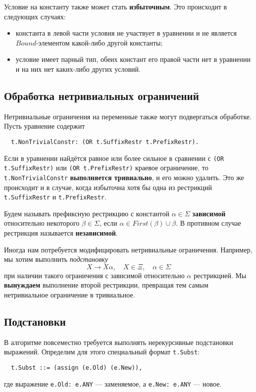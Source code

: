 \documentclass[12pt]{article}
\begin{document}
Условие на константу также может стать \textbf{избыточным}. Это происходит в
следующих случаях:
\begin{itemize}
  \item константа в левой части условия не участвует в уравнении и не является
  $Bound$-элементом какой-либо другой константы;
  \item условие имеет парный тип, обеих констант его правой части нет в
  уравнении и на них нет каких-либо других условий.
\end{itemize}


\subsection{Обработка нетривиальных ограничений}

Нетривиальные ограничения на переменные также могут подвергаться обработке.
Пусть уравнение содержит
\begin{Verbatim}
  t.NonTrivialConstr: (OR t.SuffixRestr t.PrefixRestr).
\end{Verbatim}
Если в уравнении найдётся равное или более сильное в сравнении с
\texttt{(OR t.SuffixRestr)} или \texttt{(OR t.PrefixRestr)} краевое
ограничение, то \texttt{t.NonTrivialConstr} \textbf{выполняется тривиально},
и его можно удалить. Это же происходит и в случае, когда избыточна хотя
бы одна из рестрикций \texttt{t.SuffixRestr} и \texttt{t.PrefixRestr}.

Будем называть префиксную рестрикцию с константой $\alpha \in \Sigma$
\textbf{зависимой} относительно некоторого $\beta \in \Sigma$, если
$\alpha \in First(\beta) \cup \beta$. В противном случае рестрикция называется
\textbf{независимой}.

Иногда нам потребуется модифицировать нетривиальные ограничения. Например, мы
хотим выполнить \textit{подстановку}
\begin{displaymath}
  X \to X \alpha, \quad X \in \Xi, \quad \alpha \in \Sigma
\end{displaymath}
при наличии такого ограничения с зависимой относительно $\alpha$ рестрикцией.
Мы \textbf{вынуждаем} выполнение второй рестрикции, превращая тем самым
нетривиальное ограничение в тривиальное.


\subsection{Подстановки}

В алгоритме повсеместно требуется выполнять нерекурсивные подстановки
выражений. Определим для этого специальный формат \texttt{t.Subst}:
\begin{Verbatim}
  t.Subst ::= (assign (e.Old) (e.New)),
\end{Verbatim}
где выражение \texttt{e.Old: e.ANY} --- заменяемое, а \texttt{e.New: e.ANY}
--- новое.
\end{document}
